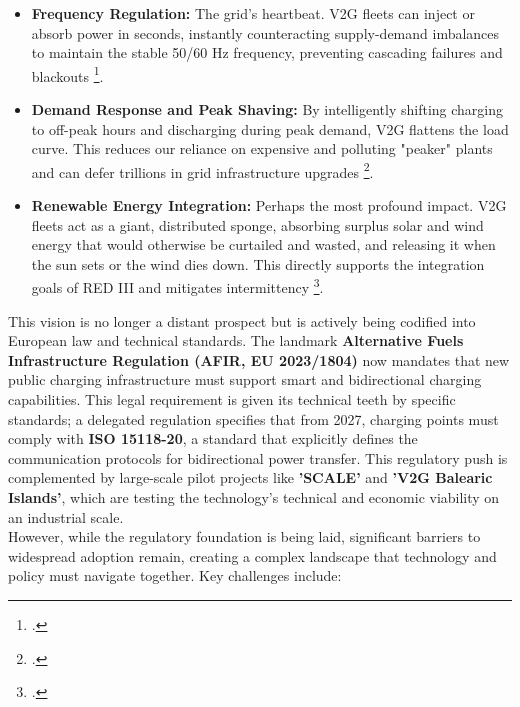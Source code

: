 \begin{itemize}
    \item \textbf{Frequency Regulation:} The grid's heartbeat. V2G fleets can inject or absorb power in seconds, instantly counteracting supply-demand imbalances to maintain the stable 50/60 Hz frequency, preventing cascading failures and blackouts \footcite{alfaverh2022optimal, sadeghi2021deep}.
    
    \item \textbf{Demand Response and Peak Shaving:} By intelligently shifting charging to off-peak hours and discharging during peak demand, V2G flattens the load curve. This reduces our reliance on expensive and polluting "peaker" plants and can defer trillions in grid infrastructure upgrades \footcite{orfanoudakis2022deep}.
    
    \item \textbf{Renewable Energy Integration:} Perhaps the most profound impact. V2G fleets act as a giant, distributed sponge, absorbing surplus solar and wind energy that would otherwise be curtailed and wasted, and releasing it when the sun sets or the wind dies down. This directly supports the integration goals of RED III and mitigates intermittency \footcite{khan2024review, zou2021deep}.
\end{itemize}
This vision is no longer a distant prospect but is actively being codified into European law and technical standards. The landmark \textbf{Alternative Fuels Infrastructure Regulation (AFIR, EU 2023/1804)} now mandates that new public charging infrastructure must support smart and bidirectional charging capabilities. This legal requirement is given its technical teeth by specific standards; a delegated regulation specifies that from 2027, charging points must comply with \textbf{ISO 15118-20}, a standard that explicitly defines the communication protocols for bidirectional power transfer. This regulatory push is complemented by large-scale pilot projects like \textbf{'SCALE'} and \textbf{'V2G Balearic Islands'}, which are testing the technology's technical and economic viability on an industrial scale.
\\
\noindent
However, while the regulatory foundation is being laid, significant barriers to widespread adoption remain, creating a complex landscape that technology and policy must navigate together. Key challenges include:
